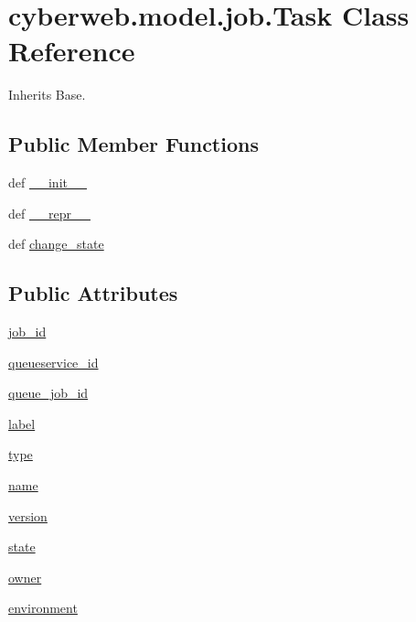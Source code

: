 \hypertarget{classcyberweb_1_1model_1_1job_1_1_task}{\section{cyberweb.\-model.\-job.\-Task \-Class \-Reference}
\label{classcyberweb_1_1model_1_1job_1_1_task}
}


\-Inherits \-Base.

\subsection*{\-Public \-Member \-Functions}
\begin{DoxyCompactItemize}
\item 
def \hyperlink{classcyberweb_1_1model_1_1job_1_1_task_a13c0d4c6f91427327503eb02d812172d}{\-\_\-\-\_\-init\-\_\-\-\_\-}
\item 
def \hyperlink{classcyberweb_1_1model_1_1job_1_1_task_a07ff52993f4242053340978daa8ea90c}{\-\_\-\-\_\-repr\-\_\-\-\_\-}
\item 
def \hyperlink{classcyberweb_1_1model_1_1job_1_1_task_aadb738d172831d17a859ecadab8a0bf3}{change\-\_\-state}
\end{DoxyCompactItemize}
\subsection*{\-Public \-Attributes}
\begin{DoxyCompactItemize}
\item 
\hyperlink{classcyberweb_1_1model_1_1job_1_1_task_a3634117ea8658c134caaec58904e1e80}{job\-\_\-id}
\item 
\hyperlink{classcyberweb_1_1model_1_1job_1_1_task_a1c7607e6c0ab5616d32d1985492905e2}{queueservice\-\_\-id}
\item 
\hyperlink{classcyberweb_1_1model_1_1job_1_1_task_aeaec264454577257e6e10ccc4d388949}{queue\-\_\-job\-\_\-id}
\item 
\hyperlink{classcyberweb_1_1model_1_1job_1_1_task_abe0c68ea4bebdc8b9a8615b21e7adc0e}{label}
\item 
\hyperlink{classcyberweb_1_1model_1_1job_1_1_task_ac510505106386094268e1868255aba7d}{type}
\item 
\hyperlink{classcyberweb_1_1model_1_1job_1_1_task_a301599720f3fe6abf5790a32d8f2ba77}{name}
\item 
\hyperlink{classcyberweb_1_1model_1_1job_1_1_task_a02bb93cd29c61c24a99469d1379d7449}{version}
\item 
\hyperlink{classcyberweb_1_1model_1_1job_1_1_task_ac822a5598f345e6b60cc5f4706cce478}{state}
\item 
\hyperlink{classcyberweb_1_1model_1_1job_1_1_task_a22390fcc5fb2948863c274b2b62db5dd}{owner}
\item 
\hyperlink{classcyberweb_1_1model_1_1job_1_1_task_a4ca0a71ff5d4de280feb1f127fab13dd}{environment}
\end{DoxyCompactItemize}
